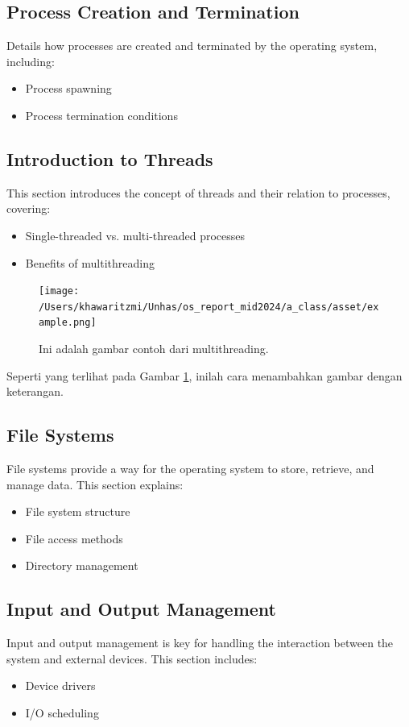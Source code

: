 \documentclass[12pt]{article}
\begin{document}
\subsection{Process Creation and Termination}
Details how processes are created and terminated by the operating system, including:
\begin{itemize}
    \item Process spawning
    \item Process termination conditions
\end{itemize}

\subsection{Introduction to Threads}
This section introduces the concept of threads and their relation to processes, covering:
\begin{itemize}
    \item Single-threaded vs. multi-threaded processes
    \item Benefits of multithreading
\end{itemize}

\begin{figure}[h]
    \centering
    \texttt{[image: /Users/khawaritzmi/Unhas/os\_report\_mid2024/a\_class/asset/example.png]}  %
    \caption{Ini adalah gambar contoh dari multithreading.}
    \label{fig:contoh_gambar}
\end{figure}

Seperti yang terlihat pada Gambar \ref{fig:contoh_gambar}, inilah cara menambahkan gambar dengan keterangan.

\subsection{File Systems}
File systems provide a way for the operating system to store, retrieve, and manage data. This section explains:
\begin{itemize}
    \item File system structure
    \item File access methods
    \item Directory management
\end{itemize}

\subsection{Input and Output Management}
Input and output management is key for handling the interaction between the system and external devices. This section includes:
\begin{itemize}
    \item Device drivers
    \item I/O scheduling
\end{itemize}
\end{document}
